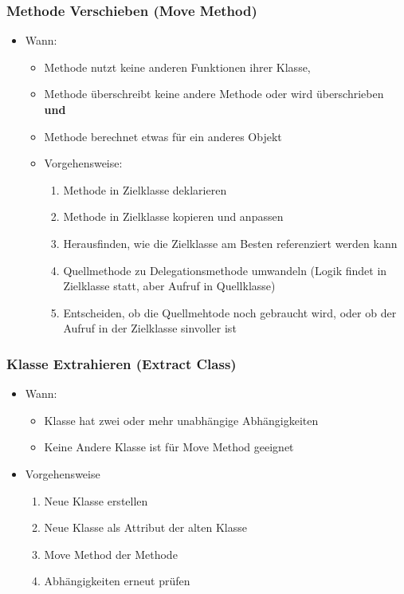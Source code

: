 \documentclass[ngerman,color=3b]{tuda_summary}
\begin{document}
\subsubsection{Methode Verschieben (Move Method)}
\begin{itemize}
    \item Wann:\begin{itemize}
              \item Methode nutzt keine anderen Funktionen ihrer Klasse,
              \item Methode überschreibt keine andere Methode oder wird überschrieben \textbf{und}
              \item Methode berechnet etwas für ein anderes Objekt
          \end{itemize}
          \begin{itemize}
              \item Vorgehensweise:\begin{enumerate}
                        \item Methode in Zielklasse deklarieren
                        \item Methode in Zielklasse kopieren und anpassen
                        \item Herausfinden, wie die Zielklasse am Besten referenziert werden kann
                        \item Quellmethode zu Delegationsmethode umwandeln (Logik findet in Zielklasse statt, aber Aufruf in Quellklasse)
                        \item Entscheiden, ob die Quellmehtode noch gebraucht wird, oder ob der Aufruf in der Zielklasse sinvoller ist
                    \end{enumerate}
          \end{itemize}
\end{itemize}
\subsubsection{Klasse Extrahieren (Extract Class)}
\begin{itemize}
    \item Wann:\begin{itemize}
              \item Klasse hat zwei oder mehr unabhängige Abhängigkeiten
              \item Keine Andere Klasse ist für Move Method geeignet
          \end{itemize}
    \item Vorgehensweise\begin{enumerate}
              \item Neue Klasse erstellen
              \item Neue Klasse als Attribut der alten Klasse
              \item Move Method der Methode
              \item Abhängigkeiten erneut prüfen
          \end{enumerate}
\end{itemize}
\end{document}
